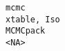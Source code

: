 \documentclass[
  letterpaper,
  DIV=11,
  numbers=noendperiod]{scrreprt}
\begin{document}
\begin{verbatim}
mcmc                                                                                                                                                                                                                                                                                                                                                                                                                                                                                                                                                                                                                                                                                                                                                                                                                                                                                                                                                                                                                                                                                                                                                                                                                                                                                              xtable, Iso
MCMCpack                                                                                                                                                                                                                                                                                                                                                                                                                                                                                                                                                                                                                                                                                                                                                                                                                                                                                                                                                                                                                                                                                                                                                                                                                                                                                                 <NA>

\end{verbatim}
\end{document}
